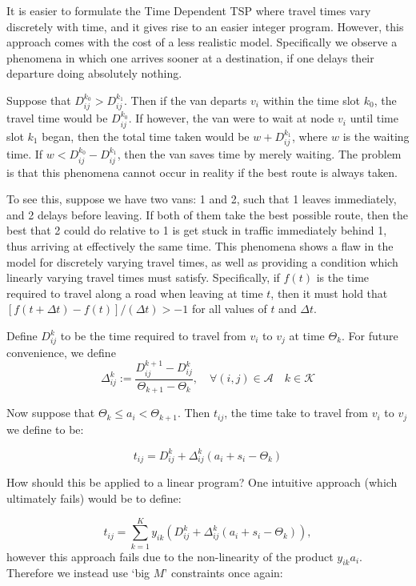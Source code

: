 It is easier to formulate the Time Dependent TSP where travel times vary discretely with time, and it gives rise to an easier integer program. However, this approach comes with the cost of a less realistic model. Specifically we observe a phenomena in which one arrives sooner at a destination, if one delays their departure doing absolutely nothing. 

Suppose that $D^{k_0}_{ij} > D^{k_1}_{ij}$. Then if the van departs $v_i$ within the time slot $k_0$, the travel time would be $D^{k_0}_{ij}$. If however, the van were to wait at node $v_i$ until time slot $k_1$ began, then the total time taken would be $w + D^{k_1}_{ij}$, where $w$ is the waiting time. If $w < D^{k_0}_{ij} - D^{k_1}_{ij}$, then the van saves time by merely waiting. The problem is that this phenomena cannot occur in reality if the best route is always taken. 

To see this, suppose we have two vans: 1 and 2, such that 1 leaves immediately, and 2 delays before leaving. If both of them take the best possible route, then the best that 2 could do relative to 1 is get stuck in traffic immediately behind 1, thus arriving at effectively the same time. This phenomena shows a flaw in the model for discretely varying travel times, as well as providing a condition which linearly varying travel times must satisfy. Specifically, if $f(t)$ is the time required to travel along a road when leaving at time $t$, then it must hold that $[f(t+ \Delta t)-f(t)]/(\Delta t ) > -1$ for all values of $t$ and $\Delta t$.

Define $D^k_{ij}$ to be the time required to travel from $v_i$ to $v_j$ at time $\Theta_k$. For future convenience, we define 
\begin{equation}
\Delta^k_{ij} := \frac{D^{k+1}_{ij} - D^k_{ij}}{\Theta_{k+1} - \Theta_k}, \quad \forall (i,j) \in \mathcal{A}\quad k \in \mathcal{K}
\end{equation}

Now suppose that $\Theta_k \leq a_i < \Theta_{k+1}$. Then $t_{ij}$, the time take to travel from $v_i$ to $v_j$ we define to be:

\begin{equation}
\label{eq:linear_travel_times_def}
t_{ij} = D^k_{ij} + \Delta^k_{ij} \left( a_i + s_i -\Theta_k\right)
\end{equation} 

How should this be applied to a linear program? One intuitive approach (which ultimately fails) would be to define:

\begin{equation}
\label{eq:linear_travel_times_def2}
t_{ij} = \sum \limits_{k = 1}^K y_{ik} \left(D^k_{ij} + \Delta^k_{ij} \left( a_i + s_i -\Theta_k\right)\right),
\end{equation} 
however this approach fails due to the non-linearity of the product $y_{ik} a_i$. Therefore we instead use `big $M$' constraints once again:

